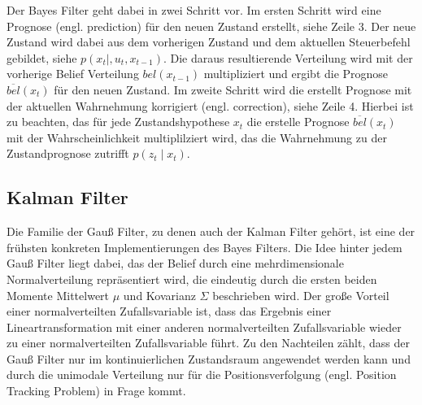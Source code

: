 Der Bayes Filter geht dabei in zwei Schritt vor. Im ersten Schritt wird eine Prognose (engl. prediction) für den neuen Zustand erstellt, siehe Zeile 3. Der neue Zustand wird dabei aus dem vorherigen Zustand und dem aktuellen Steuerbefehl gebildet, siehe $p(x_t \mid, u_t, x_{t-1})$. Die daraus resultierende Verteilung wird mit der vorherige Belief Verteilung $bel(x_{t-1})$ multipliziert und ergibt die Prognose $\overline{bel}(x_t)$ für den neuen Zustand. Im zweite Schritt wird die erstellt Prognose mit der aktuellen Wahrnehmung korrigiert (engl. correction), siehe Zeile 4. Hierbei ist zu beachten, das für jede Zustandshypothese $x_t$ die erstelle Prognose $\overline{bel}(x_t)$ mit der Wahrscheinlichkeit multiplilziert wird, das die Wahrnehmung zu der Zustandprognose zutrifft $p(z_t \mid x_t)$.


%
%
\subsection{Kalman Filter}

Die Familie der Gauß Filter, zu denen auch der Kalman Filter gehört, ist eine der frühsten konkreten Implementierungen des Bayes Filters. Die Idee hinter jedem Gauß Filter liegt dabei, das der Belief durch eine mehrdimensionale Normalverteilung repräsentiert wird, die eindeutig durch die ersten beiden Momente Mittelwert $\mu$ und Kovarianz $\Sigma$ beschrieben wird. Der große Vorteil einer normalverteilten Zufallsvariable ist, dass das Ergebnis einer Lineartransformation mit einer anderen normalverteilten Zufallsvariable wieder zu einer normalverteilten Zufallsvariable führt. Zu den Nachteilen zählt, dass der Gauß Filter nur im kontinuierlichen Zustandsraum angewendet werden kann und durch die unimodale Verteilung nur für die Positionsverfolgung (engl. Position Tracking Problem) in Frage kommt.

